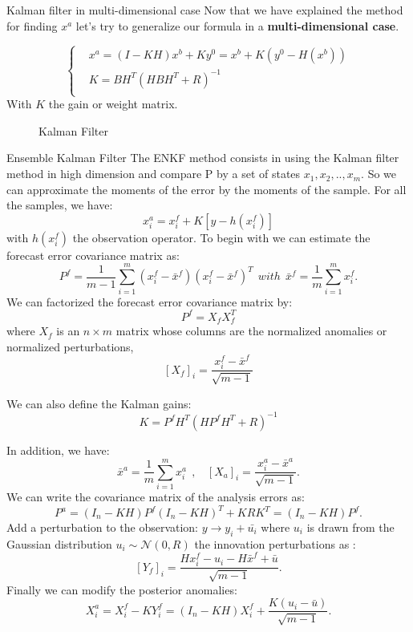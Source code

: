 \begin{frame}{Kalman filter in multi-dimensional case}
   Now that we have explained the method for finding $x^a$ let's try to generalize our formula in a \textbf{multi-dimensional case}.

   $$\left\{\begin{aligned}
     &x^a=(I-KH)x^b+Ky^0=x^b+K(y^0-H(x^b)) \\
           &K=BH^T(HBH^T+R)^{-1} \\
    \end{aligned}\right.$$
   With $K$ the gain or weight matrix.
   \begin{figure}[H]
       \caption{Kalman Filter}
   \end{figure}
\end{frame}
\begin{frame}[allowframebreaks]{Ensemble Kalman Filter}
   \noindent The ENKF method consists in using the Kalman filter method in high dimension and compare P by a set of states $x_1,x_2,..,x_{m}$. So we can approximate the moments of the error by the moments of the sample.
For all the samples, we have:
$$x_i^a=x_i^f+K[y-h(x_i^f)]$$
with $h(x_i^f)$ the observation operator.
\newline \noindent To begin with we can estimate the
forecast error covariance matrix as:
$$P^f=\frac{1}{m-1}\sum_{i=1}^{m}(x_i^f-\bar{x}^f)(x_i^f-\bar{x}^f)^T~~with~~\bar{x}^f=\frac{1}{m}\sum_{i=1}^{m}x_i^f .$$ 
\noindent We can factorized the forecast error covariance matrix by:
$$P^f=X_f X_f^T$$
where $X_f$ is an $n \times m$ matrix whose columns are the normalized anomalies or normalized perturbations,
$$[X_f]_i=\frac{x_i^f-\bar{x}^f}{\sqrt{m-1}}$$

\noindent We can also define the Kalman gains: 
$$K=P^f H^T(HP^f H^T+R)^{-1}$$

\noindent In addition, we have:
$$
\bar{x}^a=\frac{1}{m}\sum_{i=1}^mx_i^a~~,~~~~[X_a]_i=\frac{x_i^a-\bar{x}^a}{\sqrt{m-1}}. $$
\newline \noindent We can write the covariance matrix of the analysis errors as:
$$P^a=(I_n-KH)P^f(I_n-KH)^T+KRK^T=(I_n-KH)P^f.$$
\noindent Add a perturbation to the observation: $y\rightarrow y_i+\bar{u_i}$ where $u_i$ is drawn from the Gaussian distribution $u_i \sim \mathcal{N}(0,R)$
\newline the innovation perturbations as :
$$[Y_f]_i=\frac{Hx_i^f-u_i-H\bar{x}^f+\bar{u}}{\sqrt{m-1}}.$$
\noindent Finally we can modify the posterior anomalies:
$$X_i^a=X_i^f-KY_i^f=(I_n-KH)X_i^f+\frac{K(u_i-\bar{u})}{\sqrt{m-1}}.$$
\end{frame}

